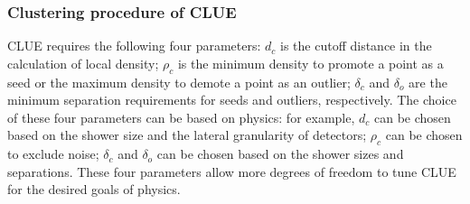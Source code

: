 
\subsubsection{Clustering procedure of CLUE}

CLUE requires the following four parameters: $d_c$ is the cutoff distance in the calculation of local density; $\rho_c$ is the minimum density to promote a point as a seed or the maximum density to demote a point as an outlier; $\delta_c$ and $\delta_o$ are the minimum separation requirements for seeds and outliers, respectively. The choice of these four parameters can be based on physics: for example, $d_c$ can be chosen based on the shower size and the lateral granularity of detectors; $\rho_c$ can be chosen to exclude noise; $\delta_c$ and $\delta_o$ can be chosen based on the shower sizes and separations. These four parameters allow more degrees of freedom to tune CLUE for the desired goals of physics. %

